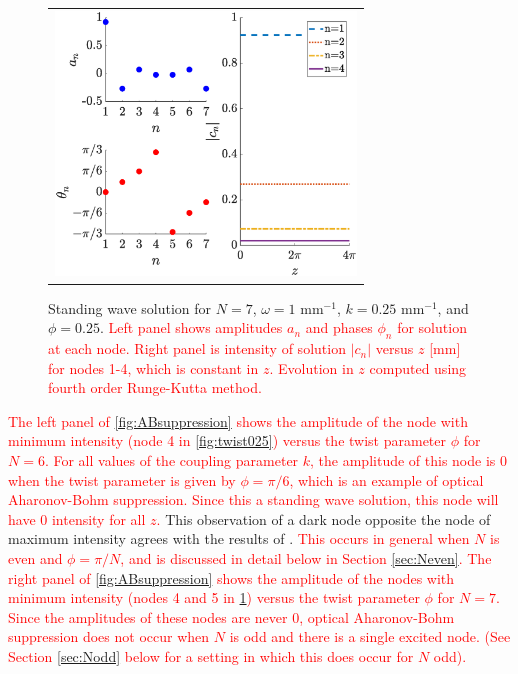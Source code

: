 \documentclass[reprint, amsmath,amssymb,aps,pra]{revtex4-2}
\renewcommand{\revised}[1]{ \textcolor{red}{#1} }
\begin{document}
\begin{figure}
    \begin{center}
    \begin{tabular}{c}
    \includegraphics[width=8cm]{twist025N7.eps}
    \end{tabular}
    \end{center}
    \caption{Standing wave solution for $N = 7$, $\omega = 1\text{ mm}^{-1}$, $k = 0.25\text{ mm}^{-1}$, and $\phi = 0.25$. \revised{Left panel shows amplitudes $a_n$ and phases $\phi_n$ for solution at each node. Right panel is intensity of solution $|c_n|$ versus $z$ [mm] for nodes 1-4, which is constant in $z$. Evolution in $z$ computed using fourth order Runge-Kutta method.} }
    \label{fig:twist025N7}
    \end{figure}

\revised{The left panel of \cref{fig:ABsuppression} shows the amplitude of the node with minimum intensity (node 4 in \cref{fig:twist025}) versus the twist parameter $\phi$ for $N=6$. For all values of the coupling parameter $k$, the amplitude of this node is 0 when the twist parameter is given by $\phi = \pi/6$, which is an example of optical Aharonov-Bohm suppression. Since this a standing wave solution, this node will have 0 intensity for all $z$.} This observation of a dark node opposite the node of maximum intensity agrees with the results of \cite{castro2016,Parto2017}. \revised{This occurs in general when $N$ is even and $\phi = \pi/N$, and is discussed in detail below in Section \ref{sec:Neven}. The right panel of \cref{fig:ABsuppression} shows the amplitude of the nodes with minimum intensity (nodes 4 and 5 in \cref{fig:twist025N7}) versus the twist parameter $\phi$ for $N=7$. Since the amplitudes of these nodes are never 0, optical Aharonov-Bohm suppression does not occur when $N$ is odd and there is a single excited node. (See Section \ref{sec:Nodd} below for a setting in which this does occur for $N$ odd). }
\end{document}
